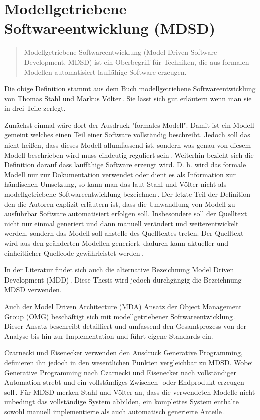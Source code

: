 \documentclass[12pt,oneside,a4paper,parskip]{scrbook}
\begin{document}
\section{Modellgetriebene Softwareentwicklung (MDSD)}

\begin{quote}\glqq Modellgetriebene Softwareentwicklung (Model Driven Software Development, MDSD) ist ein Oberbegriff für Techniken, die aus formalen Modellen automatisiert lauffähige Software erzeugen.\grqq \end{quote}

Die obige Definition stammt aus dem Buch modellgetriebene Softwareentwicklung von Thomas Stahl und Markus Völter\,\cite[S. 11]{stahl2007}. Sie lässt sich gut erläutern wenn man sie in drei Teile zerlegt.

Zunächst einmal wäre dort der Ausdruck "formales Modell". Damit ist ein Modell gemeint welches einen Teil einer Software vollständig beschreibt. Jedoch soll das nicht heißen, dass dieses Modell allumfassend ist, sondern was genau von diesem Modell beschrieben wird muss eindeutig reguliert sein\,\cite[S. 11f.]{stahl2007}. Weiterhin bezieht sich die Definition darauf dass lauffähige Software erzeugt wird. D. h. wird das formale Modell nur zur Dokumentation verwendet oder dient es als Information zur händischen Umsetzung, so kann man das laut Stahl und Völter nicht als modellgetriebene Softwareentwicklung bezeichnen\,\cite[S. 12]{stahl2007}. Der letzte Teil der Definition den die Autoren explizit erläutern ist, dass die Umwandlung von Modell zu ausführbar Software automatisiert erfolgen soll. Insbesondere soll der Quelltext nicht nur einmal generiert und dann manuell verändert und weiterentwickelt werden, sondern das Modell soll anstelle des Quelltextes treten. Der Quelltext wird aus den geänderten Modellen generiert, dadurch kann aktueller und einheitlicher Quellcode gewährleistet werden\,\cite[S. 13]{stahl2007}.

In der Literatur findet sich auch die alternative Bezeichnung Model Driven Development (MDD)\,\cite{selic2003,atkinson2003}. Diese Thesis wird jedoch durchgängig die Bezeichnung MDSD verwenden.

Auch der Model Driven Architecture (MDA) Ansatz der Object Management Group (OMG) beschäftigt sich mit modellgetriebener Softwareentwicklung\,\cite{mdaguide}. Dieser Ansatz beschreibt detailliert und umfassend den Gesamtprozess von der Analyse bis hin zur Implementation und führt eigene Standards ein. 

Czarnecki und Eisenecker verwenden den Ausdruck Generative Programming, definieren ihn jedoch in den wesentlichen Punkten vergleichbar zu MDSD. Wobei Generative Programming nach Czarnecki und Eisenecker nach vollständiger Automation strebt und ein vollständiges Zwischen- oder Endprodukt erzeugen soll\,\cite[S. 5]{czaeis2000}. Für MDSD merken Stahl und Völter an, dass die verwendeten Modelle nicht unbedingt das vollständige System abbilden, ein komplettes System enthalte sowohl manuell implementierte als auch automatisch generierte Anteile\,\cite[S. 13]{stahl2007}.
\end{document}
